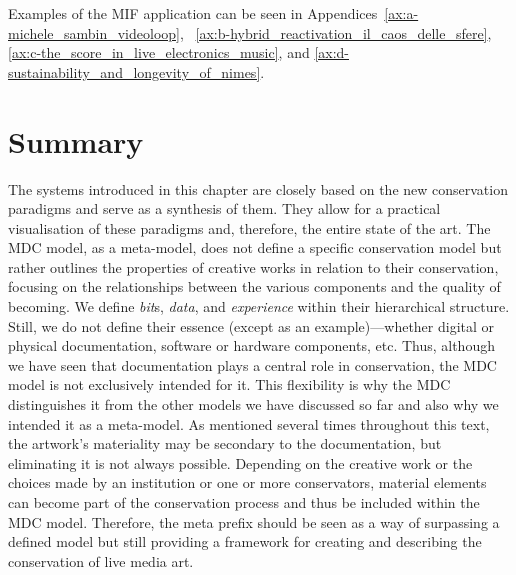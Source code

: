 Examples of the MIF application can be seen in Appendices~\ref{ax:a-michele_sambin_videoloop}, ~\ref{ax:b-hybrid_reactivation_il_caos_delle_sfere}, \ref{ax:c-the_score_in_live_electronics_music}, and \ref{ax:d-sustainability_and_longevity_of_nimes}.  

\section{Summary}
The systems introduced in this chapter are closely based on the new conservation paradigms and serve as a synthesis of them. They allow for a practical visualisation of these paradigms and, therefore, the entire state of the art.
The MDC model, as a meta-model, does not define a specific conservation model but rather outlines the properties of creative works in relation to their conservation, focusing on the relationships between the various components and the quality of becoming. We define \textit{bit}s, \textit{data}, and \textit{experience} within their hierarchical structure. Still, we do not define their essence (except as an example)—whether digital or physical documentation, software or hardware components, etc. Thus, although we have seen that documentation plays a central role in conservation, the MDC model is not exclusively intended for it. This flexibility is why the MDC distinguishes it from the other models we have discussed so far and also why we intended it as a meta-model. As mentioned several times throughout this text, the artwork's materiality may be secondary to the documentation, but eliminating it is not always possible. Depending on the creative work or the choices made by an institution or one or more conservators, material elements can become part of the conservation process and thus be included within the MDC model. Therefore, the meta prefix should be seen as a way of surpassing a defined model but still providing a framework for creating and describing the conservation of live media art.\\
